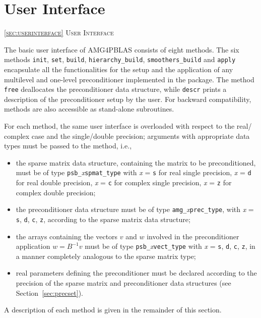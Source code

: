 \section{User Interface\label{sec:userinterface}}
         {\textsc{\ref{sec:userinterface} User Interface}}

The basic user interface of AMG4PBLAS consists of eight methods. The six
methods \verb|init|, \verb|set|, \verb|build|,
\verb|hierarchy_build|, \verb|smoothers_build| and \verb|apply|
encapsulate all the functionalities for the setup and the application
of any multilevel and one-level preconditioner implemented in the
package.
The method \verb|free| deallocates the preconditioner data structure, while
\verb|descr| prints a description of the preconditioner setup by the user.
For backward compatibility,  methods are also accessible as
stand-alone subroutines.

For each method, the same user interface is overloaded with
respect to the real/ complex case and the single/double precision;
arguments with appropriate data types must be passed to the method,
i.e.,
\begin{itemize}
\item the sparse matrix data structure, containing the matrix to be
  preconditioned, must be of type \verb|psb_|\emph{x}\verb|spmat_type|
	with \emph{x} = \verb|s| for real single precision, \emph{x} = \verb|d|
	for real double precision, \emph{x} = \verb|c| for complex single precision,
	\emph{x} = \verb|z| for complex double precision;
\item the preconditioner data structure must be of type
  \verb|amg_|\emph{x}\verb|prec_type|, with \emph{x} =
  \verb|s|, \verb|d|, \verb|c|, \verb|z|, according to the sparse
  matrix data structure;
\item the arrays containing the vectors $v$ and $w$ involved in
  the preconditioner application $w=B^{-1}v$ must be of type
  \verb|psb_|\emph{x}\verb|vect_type| with \emph{x} =
  \verb|s|, \verb|d|, \verb|c|, \verb|z|, in a manner completely
  analogous to the sparse matrix type;
\item real parameters defining the preconditioner must be declared
  according to the precision of the sparse matrix and preconditioner
  data structures (see Section~\ref{sec:precset}).
\end{itemize}
A description of each method is given in the remainder of this section.

\clearpage

